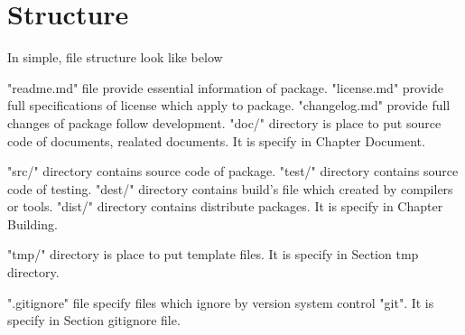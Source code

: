 \section{Structure}

\begin{crules}
\end{crules}

In simple, file structure look like below\\

"readme.md" file provide essential information of package. "license.md" provide
full specifications of license which apply to package. "changelog.md" provide
full changes of package follow development. "doc/" directory is place to put
source code of documents, realated documents.
It is specify in Chapter Document.

"src/" directory contains source code of package. "test/" directory contains
source code of testing. "dest/" directory contains build's file which
created by compilers or tools. "dist/" directory contains distribute packages.
It is specify in Chapter Building.

"tmp/" directory is place to put template files. It is specify in Section
tmp directory.

".gitignore" file specify files which ignore by version system control "git".
It is specify in Section gitignore file.
